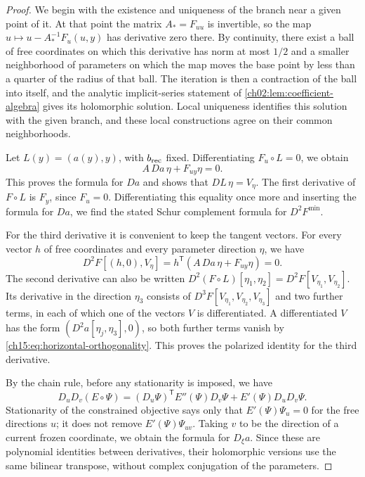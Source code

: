 \begin{proof}
We begin with the existence and uniqueness of the branch near a given point of it. At that point the matrix $A_*=F_{uu}$ is invertible, so the map $u\mapsto u-A_*^{-1}F_u(u,y)$ has derivative zero there. By continuity, there exist a ball of free coordinates on which this derivative has norm at most $1/2$ and a smaller neighborhood of parameters on which the map moves the base point by less than a quarter of the radius of that ball. The iteration is then a contraction of the ball into itself, and the analytic implicit-series statement of \cref{ch02:lem:coefficient-algebra} gives its holomorphic solution. Local uniqueness identifies this solution with the given branch, and these local constructions agree on their common neighborhoods.

Let $L(y)=(a(y),y)$, with $b_{\mathrm{rec}}$ fixed. Differentiating $F_u\circ L=0$, we obtain
\[
 A\,Da\,\eta+F_{uy}\eta=0.
\]
This proves the formula for $Da$ and shows that $DL\,\eta=V_\eta$. The first derivative of $F\circ L$ is $F_y$, since $F_u=0$. Differentiating this equality once more and inserting the formula for $Da$, we find the stated Schur complement formula for $D^2F^{\min}$.

For the third derivative it is convenient to keep the tangent vectors. For every vector $h$ of free coordinates and every parameter direction $\eta$, we have
\begin{equation}\label{ch15:eq:horizontal-orthogonality}
 D^2F[(h,0),V_\eta]
       =h^{\mathsf T}(A\,Da\,\eta+F_{uy}\eta)=0.
\end{equation}
The second derivative can also be written $D^2(F\circ L)[\eta_1,\eta_2]=D^2F[V_{\eta_1},V_{\eta_2}]$. Its derivative in the direction $\eta_3$ consists of $D^3F[V_{\eta_1},V_{\eta_2},V_{\eta_3}]$ and two further terms, in each of which one of the vectors $V$ is differentiated. A differentiated $V$ has the form $(D^2a[\eta_j,\eta_3],0)$, so both further terms vanish by \eqref{ch15:eq:horizontal-orthogonality}. This proves the polarized identity for the third derivative.

By the chain rule, before any stationarity is imposed, we have
\[
 D_uD_v(E\circ\Psi)
   =(D_u\Psi)^{\mathsf T}E''(\Psi)D_v\Psi
          +E'(\Psi)D_uD_v\Psi .
\]
Stationarity of the constrained objective says only that $E'(\Psi)\Psi_u=0$ for the free directions $u$; it does not remove $E'(\Psi)\Psi_{uv}$. Taking $v$ to be the direction of a current frozen coordinate, we obtain the formula for $D_\xi a$. Since these are polynomial identities between derivatives, their holomorphic versions use the same bilinear transpose, without complex conjugation of the parameters.


\end{proof}

